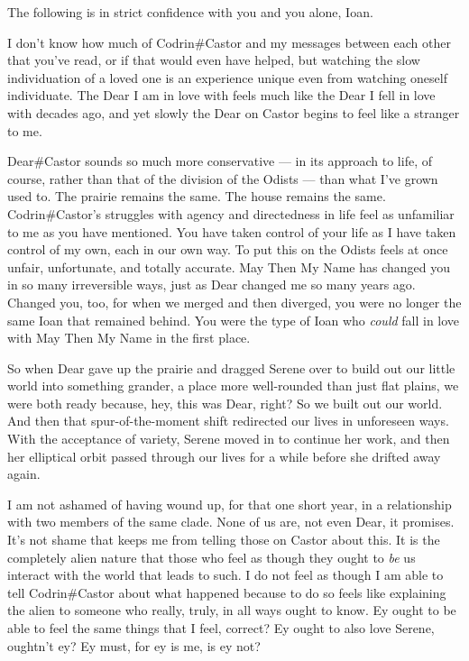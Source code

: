 The following is in strict confidence with you and you alone, Ioan.

I don't know how much of Codrin\#Castor and my messages between each other that you've read, or if that would even have helped, but watching the slow individuation of a loved one is an experience unique even from watching oneself individuate. The Dear I am in love with feels much like the Dear I fell in love with decades ago, and yet slowly the Dear on Castor begins to feel like a stranger to me.

Dear\#Castor sounds so much more conservative — in its approach to life, of course, rather than that of the division of the Odists — than what I've grown used to. The prairie remains the same. The house remains the same. Codrin\#Castor's struggles with agency and directedness in life feel as unfamiliar to me as you have mentioned. You have taken control of your life as I have taken control of my own, each in our own way. To put this on the Odists feels at once unfair, unfortunate, and totally accurate. May Then My Name has changed you in so many irreversible ways, just as Dear changed me so many years ago. Changed you, too, for when we merged and then diverged, you were no longer the same Ioan that remained behind. You were the type of Ioan who \emph{could} fall in love with May Then My Name in the first place.

So when Dear gave up the prairie and dragged Serene over to build out our little world into something grander, a place more well-rounded than just flat plains, we were both ready because, hey, this was Dear, right? So we built out our world. And then that spur-of-the-moment shift redirected our lives in unforeseen ways. With the acceptance of variety, Serene moved in to continue her work, and then her elliptical orbit passed through our lives for a while before she drifted away again.

I am not ashamed of having wound up, for that one short year, in a relationship with two members of the same clade. None of us are, not even Dear, it promises. It's not shame that keeps me from telling those on Castor about this. It is the completely alien nature that those who feel as though they ought to \emph{be} us interact with the world that leads to such. I do not feel as though I am able to tell Codrin\#Castor about what happened because to do so feels like explaining the alien to someone who really, truly, in all ways ought to know. Ey ought to be able to feel the same things that I feel, correct? Ey ought to also love Serene, oughtn't ey? Ey must, for ey is me, is ey not?

